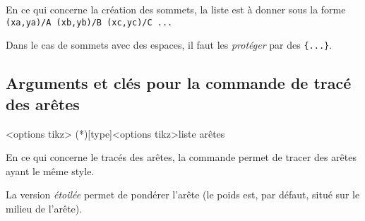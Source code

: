\documentclass[french,a4paper,11pt]{article}
\begin{document}
{\begin{tipblock}
En ce qui concerne la création des sommets, la liste est à donner sous la forme \verb!(xa,ya)/A (xb,yb)/B (xc,yc)/C ...!

\smallskip

Dans le cas de sommets avec des espaces, il faut les \textit{protéger} par des \texttt{\{...\}}.
\end{tipblock}

\begin{DemoCode}[]
\begin{GrapheTikz}[CouleurSommets={brown/purple},TypeSommets=ellipse,Police={}]
\end{GrapheTikz}
\end{DemoCode}

\begin{DemoCode}[]
\begin{GrapheTikz}[Epaisseur={very thick},Grille={5,4},DimensionSommets=1.5cm]
\end{GrapheTikz}
\end{DemoCode}

\begin{DemoCode}[]
\begin{GrapheTikz}[TypeSommets=diamond,DimensionSommets=2cm/1.5cm]
\end{GrapheTikz}
\end{DemoCode}

\pagebreak

\subsection{Arguments et clés pour la commande de tracé des arêtes}

\begin{DemoCode}
\begin{GrapheTikz}[clés]<options tikz>
	\GrphTraceAretes(*)[type]<options tikz>{liste arêtes}
\end{GrapheTikz}
\end{DemoCode}

\begin{tipblock}
En ce qui concerne le tracés des arêtes, la commande permet de tracer des arêtes ayant le même style.

\smallskip

La version \textit{étoilée} permet de pondérer l'arête (le poids est, par défaut, situé sur le milieu de l'arête).


\end{tipblock}}
\end{document}
